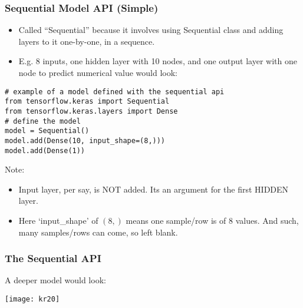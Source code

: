 \begin{frame}[fragile] \frametitle{Sequential Model API (Simple)}

\begin{itemize}
\item Called ``Sequential'' because it involves using Sequential class and adding layers to it one-by-one, in a sequence.
\item E.g. 8 inputs, one hidden layer with 10 nodes, and one output layer with one node to predict numerical value would look:
\end{itemize}

\begin{lstlisting}
# example of a model defined with the sequential api
from tensorflow.keras import Sequential
from tensorflow.keras.layers import Dense
# define the model
model = Sequential()
model.add(Dense(10, input_shape=(8,)))
model.add(Dense(1))
\end{lstlisting}

Note:
\begin{itemize}
\item Input layer, per say, is NOT added. Its an argument for the first HIDDEN layer.
\item Here `input\_shape' of $(8,)$ means one sample/row is of 8 values. And such, many samples/rows can come, so left blank.
\end{itemize}
\end{frame}

\begin{frame}[fragile] \frametitle{The Sequential API}
A deeper model would look:

\begin{center}
\texttt{[image: kr20]}
\end{center}
\end{frame}

